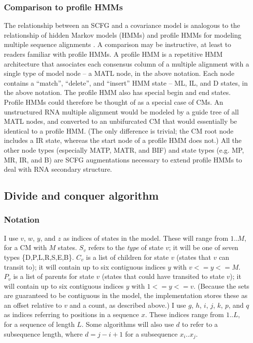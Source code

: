 \documentclass[11pt]{article}
\begin{document}
\subsubsection{Comparison to profile HMMs}

The relationship between an SCFG and a covariance model is analogous
to the relationship of hidden Markov models (HMMs) and profile HMMs
for modeling multiple sequence alignments
\cite{Krogh94,Durbin98,Eddy98}. A comparison may be instructive, at
least to readers familiar with profile HMMs.  A profile HMM is a
repetitive HMM architecture that associates each consensus column of a
multiple alignment with a single type of model node -- a MATL node, in
the above notation. Each node contains a ``match'', ``delete'', and
``insert'' HMM state -- ML, IL, and D states, in the above notation.
The profile HMM also has special begin and end states. Profile HMMs
could therefore be thought of as a special case of CMs. An
unstructured RNA multiple alignment would be modeled by a guide tree
of all MATL nodes, and converted to an unbifurcated CM that would
essentially be identical to a profile HMM. (The only difference is
trivial; the CM root node includes a IR state, whereas the start node
of a profile HMM does not.) All the other node types (especially MATP,
MATR, and BIF) and state types (e.g. MP, MR, IR, and B) are SCFG
augmentations necessary to extend profile HMMs to deal with RNA
secondary structure.



\subsection{Divide and conquer algorithm}

\subsubsection{Notation}

I use $v$, $w$, $y$, and $z$ as indices of states in the model. These
will range from $1..M$, for a CM with $M$ states. $S_v$ refers to the
\emph{type} of state $v$; it will be one of seven types
\{D,P,L,R,S,E,B\}. $C_v$ is a list of children for state $v$ (states
that $v$ can transit to); it will contain up to six contiguous indices
$y$ with $v <= y <= M$. $P_v$ is a list of parents for state $v$
(states that could have transited to state $v$); it will contain up to
six contiguous indices $y$ with $1 <= y <= v$. (Because the sets are
guaranteed to be contiguous in the model, the implementation stores
these as an offset relative to $v$ and a count, as described above.) I
use $g$, $h$, $i$, $j$, $k$, $p$, and $q$ as indices referring to
positions in a sequence $x$. These indices range from $1..L$, for a
sequence of length $L$. Some algorithms will also use $d$ to refer to
a subsequence length, where $d = j-i+1$ for a subsequence $x_i..x_j$.
\end{document}
